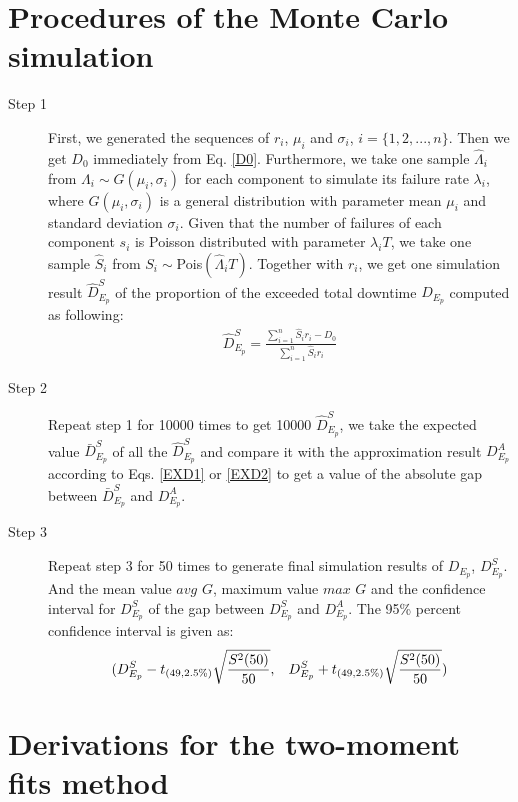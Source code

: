 \documentclass[preprint,12pt]{elsarticle}
\begin{document}
\section{Procedures of the Monte Carlo simulation}
\label{MCP}
\begin{description}
\item[Step 1]
First, we generated the sequences of $r_{i}$, $\mu_{i}$ and $\sigma_{i}$, $i=\{1,2,...,n\}$. Then we get $D_0$ immediately from Eq. \eqref{D0}. Furthermore, we take one sample $\hat{\Lambda}_{i}$ from $\Lambda_{i} \sim G(\mu_{i},\sigma_{i})$ for each component to simulate its failure rate $\lambda_{i}$, where $G(\mu_{i},\sigma_{i})$ is a general distribution with parameter mean $\mu_{i}$ and standard deviation $\sigma_{i}$. Given that the number of failures of each component $s_{i}$ is Poisson distributed with parameter $\lambda_{i}T$, we take one sample $\hat{S}_{i}$ from $S_{i}\sim$Pois$(\hat{\Lambda}_{i}T)$. Together with $r_{i}$, we get one simulation result $\hat{D}_{E_{p}}^{S}$ of the proportion of the exceeded total downtime $D_{E_{p}}$ computed as following:
\begin{eqnarray}
\hat{D}_{E_{p}}^{S}=\frac{\sum_{i=1}^{n}{\hat{S}_{i}r_{i}}-D_0}{\sum_{i=1}^{n}{\hat{S}_{i}r_{i}}}
\end{eqnarray}

\item[Step 2]

Repeat step 1 for 10000 times to get 10000 $\hat{D}_{E_{p}}^{S}$, we take the expected value $\bar{D}_{E_{p}}^{S}$ of all the $\hat{D}_{E_{p}}^{S}$ and compare it with the approximation result $D_{E_{p}}^{A}$ according to Eqs. \eqref{EXD1} or \eqref{EXD2}  to get a value of the absolute gap between $\bar{D}_{E_{p}}^{S}$ and $D_{E_{p}}^{A}$.

\item[Step 3]

Repeat step 3 for 50 times to generate final simulation results of $D_{E_{p}}$, $D_{E_{p}}^{S}$. And the mean value $avg$ $G$, maximum value $max$ $G$ and the confidence interval for $D_{E_{p}}^{S}$ of the gap between $D_{E_{p}}^{S}$ and $D_{E_{p}}^{A}$. The 95\% percent confidence interval is given as:
$$(D_{E_{p}}^{S}-t_{(49,2.5\%)}\sqrt{\frac{S^{2}(50)}{50}},\hspace{3mm}D_{E_{p}}^{S}+t_{(49,2.5\%)}\sqrt{\frac{S^{2}(50)}{50}} ) $$

\end{description}

\section{Derivations for the two-moment fits method}
\label{AG}
\end{document}

